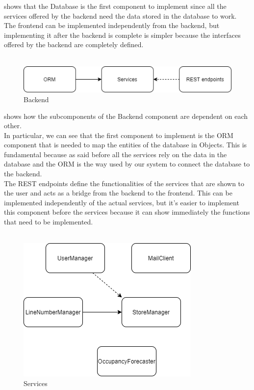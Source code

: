  shows that the Database is the first component to implement since all the services offered by the backend
need the data stored in the database to work. \\
The frontend can be implemented independently from the backend, but implementing it after the backend is complete is simpler because the interfaces
offered by the backend are completely defined.\\
\\
\begin{figure}[H]
    \centering
    \includegraphics{Images/IntegrationAndTestingPlan/Backend.png}
    \caption{Backend}
    \label{fig:Backend}
\end{figure}
 shows how the subcomponents of the Backend component are dependent on each other. \\
In particular, we can see that the first component to implement is the ORM component that is needed to map the entities of the database in Objects. This is fundamental because as said before all the services rely on the data in the database and the ORM is
the way used by our system to connect the database to the backend.\\
The REST endpoints define the functionalities of the services that are shown to the user and acts as a bridge from the backend
to the frontend.
This can be implemented independently of the actual services, but it's easier to implement this component before the services because
it can show immediately the functions that need to be implemented.\\
\\
\begin{figure}[H]
    \centering
    \includegraphics[height=0.4\textwidth]{Images/IntegrationAndTestingPlan/Services.png}
    \caption{Services}
    \label{fig:Services}
\end{figure}
